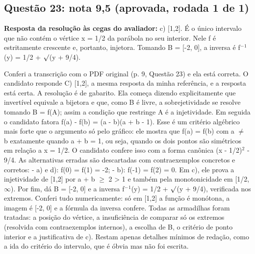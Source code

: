 \documentclass{article}%
\begin{document}
\subsection*{Questão 23: nota 9,5 (aprovada, rodada 1 de 1)}%
\textbf{Resposta da resolução às cegas do avaliador:} c) {[}1,2{]}. É o único intervalo que não contém o vértice x = 1/2 da parábola no seu interior. Nele f é estritamente crescente e, portanto, injetora. Tomando B = {[}-2, 0{]}, a inversa é f$^{-}$$^{1}$(y) = 1/2 + $\surd$(y + 9/4).\par %
Conferi a transcrição com o PDF original (p. 9, Questão 23) e ela está correta. O candidato responde C) {[}1,2{]}, a mesma resposta da minha referência, e a resposta está certa.\newline%
\newline%
A resolução é de gabarito. Ela começa dizendo explicitamente que invertível equivale a bijetora e que, como B é livre, a sobrejetividade se resolve tomando B = f(A); assim a condição que restringe A é a injetividade. Em seguida o candidato fatora f(a) - f(b) = (a - b)(a + b - 1). Esse é um critério algébrico mais forte que o argumento só pelo gráfico: ele mostra que f(a) = f(b) com a $\neq$ b exatamente quando a + b = 1, ou seja, quando os dois pontos são simétricos em relação a x = 1/2. O candidato confere isso com a forma canônica (x - 1/2)$^2$ - 9/4.\newline%
\newline%
As alternativas erradas são descartadas com contraexemplos concretos e corretos:\newline%
{-} a) e d): f(0) = f(1) = -2;\newline%
{-} b): f(-1) = f(2) = 0.\newline%
\newline%
Em c), ele prova a injetividade de {[}1,2{]} por a + b $\geq$ 2 > 1 e também pela monotonicidade em {[}1/2, $\infty$). Por fim, dá B = {[}-2, 0{]} e a inversa f$^{-}$$^{1}$(y) = 1/2 + $\surd$(y + 9/4), verificada nos extremos. Conferi tudo numericamente: só em {[}1,2{]} a função é monótona, a imagem é {[}-2, 0{]} e a fórmula da inversa confere.\newline%
\newline%
Todas as armadilhas foram tratadas: a posição do vértice, a insuficiência de comparar só os extremos (resolvida com contraexemplos internos), a escolha de B, o critério de ponto interior e a justificativa de c). Restam apenas detalhes mínimos de redação, como a ida do critério do intervalo, que é óbvia mas não foi escrita.%
\end{document}

